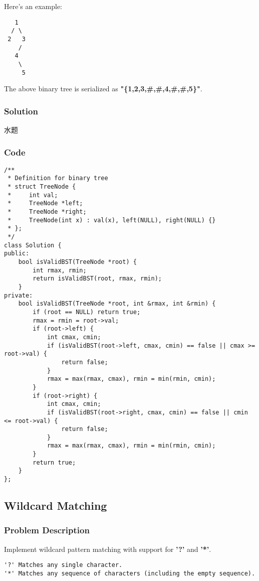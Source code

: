\documentclass[courier]{article}
\begin{document}
\begin{CJK*}{UTF8}{gkai}
Here's an example:


\begin{verbatim}
   1
  / \
 2   3
    /
   4
    \
     5
\end{verbatim}
The above binary tree is serialized as \textbf{"\{1,2,3,\#,\#,4,\#,\#,5\}"}.



\subsubsection*{Solution}
水题

\subsubsection*{Code}
\begin{lstlisting}
/**
 * Definition for binary tree
 * struct TreeNode {
 *     int val;
 *     TreeNode *left;
 *     TreeNode *right;
 *     TreeNode(int x) : val(x), left(NULL), right(NULL) {}
 * };
 */
class Solution {
public:
    bool isValidBST(TreeNode *root) {
        int rmax, rmin;
        return isValidBST(root, rmax, rmin);
    }
private:
    bool isValidBST(TreeNode *root, int &rmax, int &rmin) {
        if (root == NULL) return true;
        rmax = rmin = root->val;
        if (root->left) {
            int cmax, cmin;
            if (isValidBST(root->left, cmax, cmin) == false || cmax >= root->val) {
                return false;
            }
            rmax = max(rmax, cmax), rmin = min(rmin, cmin);
        }
        if (root->right) {
            int cmax, cmin;
            if (isValidBST(root->right, cmax, cmin) == false || cmin <= root->val) {
                return false;
            }
            rmax = max(rmax, cmax), rmin = min(rmin, cmin);
        }
        return true;
    }
}; 
\end{lstlisting}


\subsection{ Wildcard Matching }

\subsubsection*{Problem Description}
Implement wildcard pattern matching with support for \textbf{'?'} and \textbf{'*'}.

\begin{verbatim}
'?' Matches any single character.
'*' Matches any sequence of characters (including the empty sequence).


\end{verbatim}
\end{CJK*}
\end{document}
